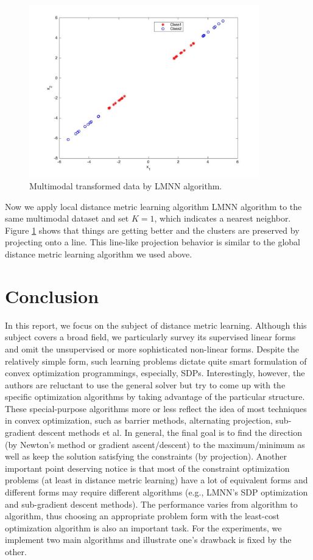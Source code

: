 \documentclass[12pt]{article}
\begin{document}
\begin{figure}[h!]
\centering
\includegraphics[width=10cm]{fig/mult-lmnn.jpg}
\caption{Multimodal transformed data by LMNN algorithm.}
\label{fig4}
\end{figure}


Now we apply local distance metric learning algorithm LMNN algorithm to the same multimodal dataset and set $K=1$, which indicates a nearest neighbor. Figure \ref{fig4} shows that things are getting better and the clusters are preserved by projecting onto a line. This line-like projection behavior is similar to the global distance metric learning algorithm we used above.


\section{Conclusion}
In this report, we focus on the subject of distance metric learning. Although this subject covers a broad field, we particularly survey its supervised linear forms and omit the unsupervised or more sophisticated non-linear forms. Despite the relatively simple form, such learning problems dictate quite smart formulation of convex optimization programmings, especially, SDPs. Interestingly, however, the authors are reluctant to use the general solver but try to come up with the specific optimization algorithms by taking advantage of the particular structure. These special-purpose algorithms more or less reflect the idea of most techniques in convex optimization, such as barrier methods, alternating projection, sub-gradient descent methods et al. In general,  the final goal is to find the direction (by Newton's method or gradient ascent/descent) to the maximum/minimum as well as keep the solution satisfying the constraints (by projection). Another important point deserving notice is that most of the constraint optimization problems (at least in distance metric learning) have a lot of equivalent forms and different forms may require different algorithms (e.g., LMNN's SDP optimization and sub-gradient descent methods). The performance varies from algorithm to algorithm, thus choosing an appropriate problem form with the least-cost  optimization algorithm is also an important task. For the experiments, we implement two main algorithms and illustrate one's drawback is fixed by the other.






\end{document}

